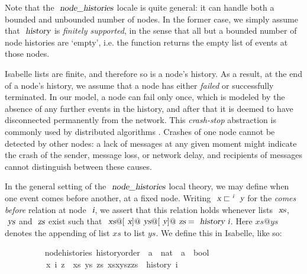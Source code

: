 \documentclass[acmlarge,review,anonymous]{acmart}\settopmatter{printfolios=true}
\begin{document}
Note that the $\isa{node{\isacharunderscore}histories}$ locale is quite general: it can handle both a bounded and unbounded number of nodes.
In the former case, we simply assume that $\isa{history}$ is \emph{finitely supported}, in the sense that all but a bounded number of node histories are `empty', i.e. the function returns the empty list of events at those nodes.

Isabelle lists are finite, and therefore so is a node's history.
As a result, at the end of a node's history, we assume that a node has either \emph{failed} or successfully terminated.
In our model, a node can fail only once, which is modeled by the absence of any further events in the history, and after that it is deemed to have disconnected permanently from the network.
This \emph{crash-stop} abstraction is commonly used by distributed algorithms \cite{Cachin:2011wt}.
Crashes of one node cannot be detected by other nodes: a lack of messages at any given moment might indicate the crash of the sender, message loss, or network delay, and recipients of messages cannot distinguish between these causes.

In the general setting of the $\isa{node{\isacharunderscore}histories}$ local theory, we may define when one event comes before another, at a fixed node.
Writing $\isa{x} \sqsubset^\isa{i} \isa{y}$ for the \emph{comes before} relation at node $\isa{i}$, we assert that this relation holds whenever lists $\isa{xs}$, $\isa{ys}$ and $\isa{zs}$ exist such that $\isa{xs}@[\isa{x}]@\isa{ys}@[\isa{y}]@\isa{zs} = \isa{history\ i}$.
Here $xs@ys$ denotes the appending of list $xs$ to list $ys$.
We define this in Isabelle, like so:
\\
\begin{isabellebody}
\ \ \ \ \ \ \ \  {\isacharparenleft}\ node{\isacharunderscore}histories{\isacharparenright}\ history{\isacharunderscore}order\ {\isacharcolon}{\isacharcolon}\ {\isachardoublequoteopen}{\isacharprime}a\ {\isasymRightarrow}\ nat\ {\isasymRightarrow}\ {\isacharprime}a\ {\isasymRightarrow}\ bool{\isachardoublequoteclose}\ {\isacharparenleft}{\isachardoublequoteopen}{\isacharunderscore}{\isacharslash}\ {\isasymsqsubset}\isactrlsup {\isacharunderscore}{\isacharslash}\ {\isacharunderscore}{\isachardoublequoteclose}\ {\isacharbrackleft}{}{}{\isacharcomma}{}{}{}{}{\isacharcomma}{}{}{\isacharbrackright}{}{}{\isacharparenright}\ \isanewline
\ \ \ \ \ \ \ \ \ \ {\isachardoublequoteopen}x\ {\isasymsqsubset}\isactrlsup i\ z\ {\isasymequiv}\ {\isasymexists}xs\ ys\ zs{\isachardot}\ xs{\isacharat}x{\isacharhash}ys{\isacharat}z{\isacharhash}zs\ {\isacharequal}\ history\ i{\isachardoublequoteclose}
\end{isabellebody}
\vspace{\baselineskip}
\end{document}
